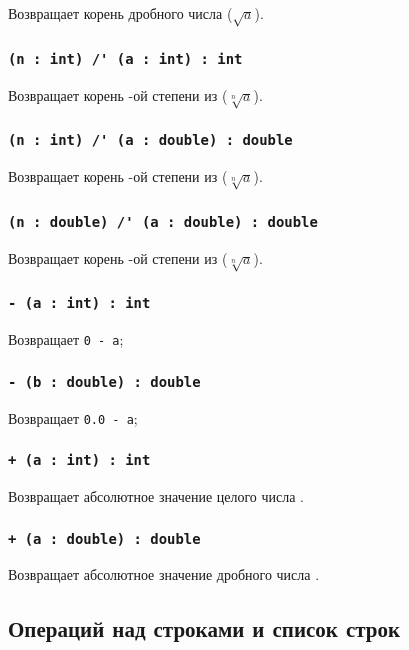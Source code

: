 Возвращает корень дробного числа  ($\sqrt{a}$).

\subsubsection{\lstinline|(n : int) /' (a : int) : int|}

Возвращает корень -ой степени из  ($\sqrt[n]{a}$).

\subsubsection{\lstinline|(n : int) /' (a : double) : double|}

Возвращает корень -ой степени из  ($\sqrt[n]{a}$).

\subsubsection{\lstinline|(n : double) /' (a : double) : double|}

Возвращает корень -ой степени из  ($\sqrt[n]{a}$).


\subsubsection{\lstinline|- (a : int) : int|}

Возвращает \lstinline|0 - a|;

\subsubsection{\lstinline|- (b : double) : double|}

Возвращает \lstinline|0.0 - a|;

\subsubsection{\lstinline|+ (a : int) : int|}

Возвращает абсолютное значение целого числа .

\subsubsection{\lstinline|+ (a : double) : double|}

Возвращает абсолютное значение дробного числа .

\subsection{Операций над строками и список строк}

